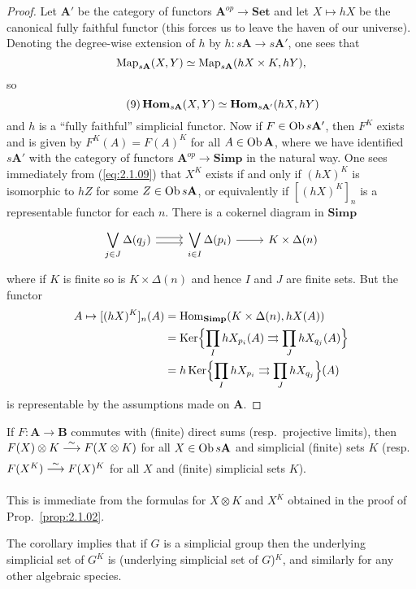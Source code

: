 \documentclass[../main]{subfiles}
\begin{document}
\begin{proof}
Let $\mathbf A'$ be the category of functors $\mathbf A^{op} \longrightarrow \mathbf{Set}$ and let $X \mapsto hX$ be the canonical fully faithful functor (this forces us to leave the haven of our universe). Denoting the degree-wise extension of $h$ by $h \colon s\mathbf A \longrightarrow s\mathbf A'$, one sees that 
\[
\operatorname{Map}_{s\mathbf A}(X, Y) \simeq \operatorname{Map}_{s\mathbf A}(hX \times K, hY),
\]
so
\begin{equation}\tag{9}
\label{eq:2.1.09}
    \operatorname{\mathbf{Hom}}_{s\mathbf A}(X, Y) \simeq \operatorname{\mathbf{Hom}}_{s\mathbf A'}(hX, hY)
\end{equation}
and $h$ is a ``fully faithful'' simplicial functor. Now if $F \in \operatorname{Ob} s\mathbf A'$, then $F^K$ exists and is given by $F^K(A) = F(A)^K$ for all $A \in \operatorname{Ob}\mathbf A$, where we have identified $s\mathbf A'$ with the category of functors $\mathbf A^{op} \longrightarrow \mathbf{Simp}$ in the natural way. One sees immediately from (\ref{eq:2.1.09}) that $X^K$ exists if and only if $(hX)^K$ is isomorphic to $hZ$ for some $Z \in \operatorname{Ob} s\mathbf A$, or equivalently if $[(hX)^K]_n$ is a representable functor for each $n$. There is a cokernel diagram in $\mathbf{Simp}$ 
\[
\begin{tikzcd}
    \displaystyle\bigvee_{j \in J} \Delta(q_j) 
    \arrow[r, shift left = 1]
    \arrow[r, shift right = 1]
    &
    \displaystyle\bigvee_{i \in I} \Delta(p_i)
    \arrow[r]
    &
    K \times \Delta(n)
\end{tikzcd}
\]
where if $K$ is finite so is $K \times \Delta(n)$ and hence $I$ and $J$ are finite sets. But the functor 
\begin{align*}
    A \mapsto [(hX)^K]_n(A)
    &= \operatorname{Hom}_{\mathbf{Simp}} (K \times \Delta(n), hX(A))
    \\&= \operatorname{Ker}\Bigl\{\prod_I hX_{p_i} (A) \rightrightarrows \prod_J hX_{q_j}(A)\Bigr\}
    \\&= h\operatorname{Ker}\Bigl\{\prod_I hX_{p_i} \rightrightarrows \prod_J hX_{q_j}\Bigr\}(A)
\end{align*}
is representable by the assumptions made on $\mathbf A$.
\end{proof}

\begin{corollary*}
If $F \colon \mathbf A \longrightarrow \mathbf B$ commutes with (finite) direct sums (resp.\ projective limits), then $F(X) \otimes K \varrightarrow \sim F(X \otimes K)$ for all $X \in \operatorname{Ob} s\mathbf A$ and simplicial (finite) sets $K$ (resp.\ $F(X^K) \varrightarrow \sim F(X)^K$ for all $X$ and (finite) simplicial sets $K$).
\end{corollary*}

This is immediate from the formulas for $X \otimes K$ and $X^K$ obtained in the proof of Prop.\ \ref{prop:2.1.02}.

\begin{remark*}
The corollary implies that if $G$ is a simplicial group then the underlying simplicial set of $G^K$ is (underlying simplicial set of $G$)$^K$, and similarly for any other algebraic species.
\end{remark*}
\end{document}
